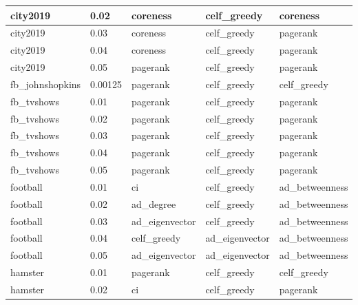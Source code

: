 \begin{longtable}[c]{|l|l|l|l|l|}
	city2019         & 0.02            & coreness               & celf\_greedy           & coreness            \\ \hline
	city2019         & 0.03            & coreness               & celf\_greedy           & pagerank            \\ \hline
	city2019         & 0.04            & coreness               & celf\_greedy           & pagerank            \\ \hline
	city2019         & 0.05            & pagerank               & celf\_greedy           & pagerank            \\ \hline
	fb\_johnshopkins & 0.00125         & pagerank               & celf\_greedy           & celf\_greedy        \\ \hline
	fb\_tvshows      & 0.01            & pagerank               & celf\_greedy           & pagerank            \\ \hline
	fb\_tvshows      & 0.02            & pagerank               & celf\_greedy           & pagerank            \\ \hline
	fb\_tvshows      & 0.03            & pagerank               & celf\_greedy           & pagerank            \\ \hline
	fb\_tvshows      & 0.04            & pagerank               & celf\_greedy           & pagerank            \\ \hline
	fb\_tvshows      & 0.05            & pagerank               & celf\_greedy           & pagerank            \\ \hline
	football         & 0.01            & ci                     & celf\_greedy           & ad\_betweenness     \\ \hline
	football         & 0.02            & ad\_degree             & celf\_greedy           & ad\_betweenness     \\ \hline
	football         & 0.03            & ad\_eigenvector        & celf\_greedy           & ad\_betweenness     \\ \hline
	football         & 0.04            & celf\_greedy           & ad\_eigenvector        & ad\_betweenness     \\ \hline
	football         & 0.05            & ad\_eigenvector        & ad\_eigenvector        & ad\_betweenness     \\ \hline
	hamster          & 0.01            & pagerank               & celf\_greedy           & celf\_greedy        \\ \hline
	hamster          & 0.02            & ci                     & celf\_greedy           & pagerank            \\ \hline

\end{longtable}
